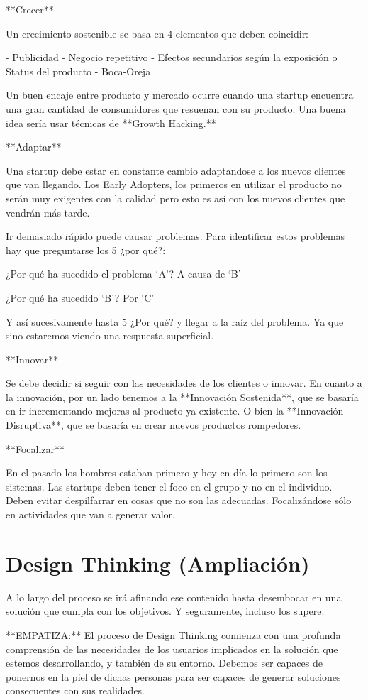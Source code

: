 \documentclass[12pt,twoside,titlepage]{report}
\begin{document}
**Crecer**

Un crecimiento sostenible se basa en 4 elementos que deben coincidir: 

- Publicidad
- Negocio repetitivo
- Efectos secundarios según la exposición o Status del producto
- Boca-Oreja

Un buen encaje entre producto y mercado ocurre cuando una startup encuentra una gran cantidad de consumidores que resuenan con su producto. Una buena idea sería usar técnicas de **Growth Hacking.**

**Adaptar**

Una startup debe estar en constante cambio adaptandose a los nuevos clientes que van llegando. Los Early Adopters, los primeros en utilizar el producto no serán muy exigentes con la calidad pero esto es así con los nuevos clientes que vendrán más tarde.

Ir demasiado rápido puede causar problemas. Para identificar estos problemas hay que preguntarse los 5 ¿por qué?:

¿Por qué ha sucedido el problema ‘A’? A causa de ‘B’

¿Por qué ha sucedido ‘B’? Por ‘C’

Y así sucesivamente hasta 5 ¿Por qué? y llegar a la raíz del problema. Ya que sino estaremos viendo una respuesta superficial.

**Innovar**

Se debe decidir si seguir con las necesidades de los clientes o innovar. En cuanto a la innovación, por un lado tenemos a la **Innovación Sostenida**, que se basaría en ir incrementando mejoras al producto ya existente. O bien la **Innovación Disruptiva**, que se basaría en crear nuevos productos rompedores.

**Focalizar**

En el pasado los hombres estaban primero y hoy en día lo primero son los sistemas. Las startups deben tener el foco en el grupo y no en el individuo. Deben evitar despilfarrar en cosas que no son las adecuadas. Focalizándose sólo en actividades que van a generar valor.

\section{Design Thinking (Ampliación)}

A lo largo del proceso se irá afinando ese contenido hasta desembocar en una solución que cumpla con los objetivos. Y seguramente, incluso los supere.

**EMPATIZA:** El proceso de Design Thinking comienza con una profunda comprensión de las necesidades de los usuarios implicados en la solución que estemos desarrollando, y también de su entorno. Debemos ser capaces de ponernos en la piel de dichas personas para ser capaces de generar soluciones consecuentes con sus realidades.
\end{document}
